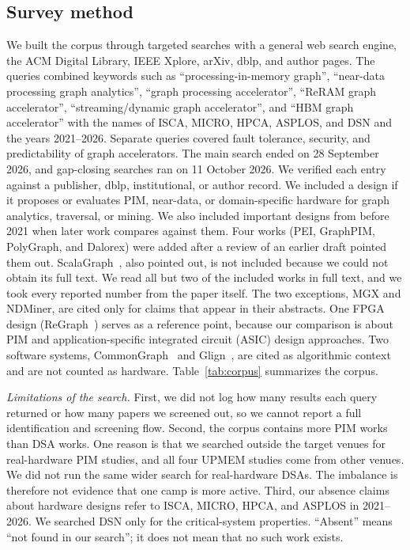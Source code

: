 \documentclass[journal,onecolumn]{IEEEtran}
\begin{document}
\subsection{Survey method}
We built the corpus through targeted searches with a general web search engine, the ACM Digital Library, IEEE Xplore, arXiv, dblp, and author pages. The queries combined keywords such as ``processing-in-memory graph'', ``near-data processing graph analytics'', ``graph processing accelerator'', ``ReRAM graph accelerator'', ``streaming/dynamic graph accelerator'', and ``HBM graph accelerator'' with the names of ISCA, MICRO, HPCA, ASPLOS, and DSN and the years 2021--2026. Separate queries covered fault tolerance, security, and predictability of graph accelerators. The main search ended on 28 September 2026, and gap-closing searches ran on 11 October 2026. We verified each entry against a publisher, dblp, institutional, or author record. We included a design if it proposes or evaluates PIM, near-data, or domain-specific hardware for graph analytics, traversal, or mining. We also included important designs from before 2021 when later work compares against them. Four works (PEI, GraphPIM, PolyGraph, and Dalorex) were added after a review of an earlier draft pointed them out. ScalaGraph~\cite{yao2022scalagraph}, also pointed out, is not included because we could not obtain its full text. We read all but two of the included works in full text, and we took every reported number from the paper itself. The two exceptions, MGX and NDMiner, are cited only for claims that appear in their abstracts. One FPGA design (ReGraph~\cite{chen2022regraph}) serves as a reference point, because our comparison is about PIM and application-specific integrated circuit (ASIC) design approaches. Two software systems, CommonGraph~\cite{afarin2023commongraph} and Glign~\cite{yin2023glign}, are cited as algorithmic context and are not counted as hardware. Table~\ref{tab:corpus} summarizes the corpus.

\emph{Limitations of the search.} First, we did not log how many results each query returned or how many papers we screened out, so we cannot report a full identification and screening flow. Second, the corpus contains more PIM works than DSA works. One reason is that we searched outside the target venues for real-hardware PIM studies, and all four UPMEM studies come from other venues. We did not run the same wider search for real-hardware DSAs. The imbalance is therefore not evidence that one camp is more active. Third, our absence claims about hardware designs refer to ISCA, MICRO, HPCA, and ASPLOS in 2021--2026. We searched DSN only for the critical-system properties. ``Absent'' means ``not found in our search''; it does not mean that no such work exists.
\end{document}
